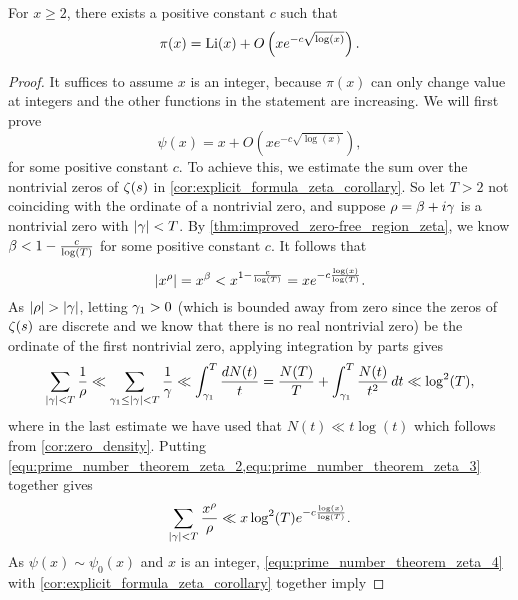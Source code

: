     \begin{theorem*}
      For $x \ge 2$, there exists a positive constant $c$ such that
      \[
        \pi(x) = \operatorname{\mathrm{Li}}(x)+O\left(xe^{-c\sqrt{\log(x)}}\right).
      \]
    \end{theorem*}
    \begin{proof}
      It suffices to assume $x$ is an integer, because $\pi(x)$ can only change value at integers and the other functions in the statement are increasing. We will first prove
      \begin{equation}\label{equ:prime_number_theorem_zeta_1}
        \psi(x) = x+O\left(xe^{-c\sqrt{\log(x)}}\right),
      \end{equation}
      for some positive constant $c$. To achieve this, we estimate the sum over the nontrivial zeros of $\zeta(s)$ in \cref{cor:explicit_formula_zeta_corollary}. So let $T > 2$ not coinciding with the ordinate of a nontrivial zero, and suppose $\rho = \beta+i\gamma$ is a nontrivial zero with $|\gamma| < T$. By \cref{thm:improved_zero-free_region_zeta}, we know $\beta < 1-\frac{c}{\log(T)}$ for some positive constant $c$. It follows that
      \begin{equation}\label{equ:prime_number_theorem_zeta_2}
        |x^{\rho}| = x^{\beta} < x^{1-\frac{c}{\log(T)}} = xe^{-c\frac{\log(x)}{\log(T)}}.
      \end{equation}
      As $|\rho| > |\gamma|$, letting $\gamma_{1} > 0$ (which is bounded away from zero since the zeros of $\zeta(s)$ are discrete and we know that there is no real nontrivial zero) be the ordinate of the first nontrivial zero, applying integration by parts gives
      \begin{equation}\label{equ:prime_number_theorem_zeta_3}
        \sum_{|\gamma| < T}\frac{1}{\rho} \ll \sum_{\gamma_{1} \le |\gamma| < T}\frac{1}{\gamma} \ll \int_{\gamma_{1}}^{T}\frac{dN(t)}{t} = \frac{N(T)}{T}+\int_{\gamma_{1}}^{T}\frac{N(t)}{t^{2}}\,dt \ll \log^{2}(T),
      \end{equation}
      where in the last estimate we have used that $N(t) \ll t\log(t)$ which follows from \cref{cor:zero_density}. Putting \cref{equ:prime_number_theorem_zeta_2,equ:prime_number_theorem_zeta_3} together gives
      \begin{equation}\label{equ:prime_number_theorem_zeta_4}
        \sum_{|\gamma| < T}\frac{x^{\rho}}{\rho} \ll x\log^{2}(T)e^{-c\frac{\log(x)}{\log(T)}}.
      \end{equation}
      As $\psi(x) \sim \psi_{0}(x)$ and $x$ is an integer, \cref{equ:prime_number_theorem_zeta_4} with \cref{cor:explicit_formula_zeta_corollary} together imply

\end{proof}

